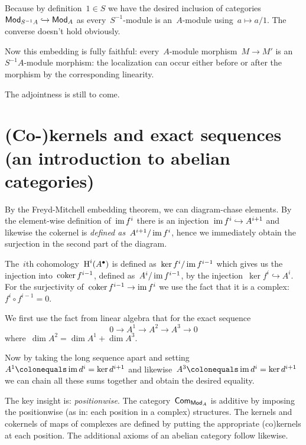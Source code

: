 \begin{exercise} %
  Because by definition~$1\in S$ we have the desired inclusion of categories~$\mathsf{Mod}_{S^{-1}A}\hookrightarrow\mathsf{Mod}_A$ as every~$S^{-1}$\nobreakdash-module is an~$A$\nobreakdash-module using~$a\mapsto a/1$. The converse doesn't hold obviously.

  Now this embedding is fully faithful: every~$A$\nobreakdash-module morphism~$M\to M'$ is an~$S^{-1}A$\nobreakdash-module morphism: the localization can occur either before or after the morphism by the corresponding linearity.

  The adjointness is still to come.
\end{exercise}


\section{(Co-)kernels and exact sequences (an introduction to abelian categories)}

\begin{exercise}
  By the Freyd-Mitchell embedding theorem, we can diagram-chase elements. By the element-wise definition of~$\operatorname{im} f^i$ there is an injection~$\operatorname{im} f^i\hookrightarrow A^{i+1}$ and likewise the cokernel is \emph{defined as}~$A^{i+1}/\operatorname{im} f^i$, hence we immediately obtain the surjection in the second part of the diagram.

  The~$i$th cohomology~$\operatorname{H}^i(A^\bullet)$ is defined as~$\ker f^i/\operatorname{im} f^{i-1}$ which gives us the injection into~$\operatorname{coker} f^{i-1}$, defined as~$A^i/\operatorname{im} f^{i-1}$, by the injection~$\ker f^{i}\hookrightarrow A^i$. For the surjectivity of~$\operatorname{coker} f^{i-1}\to\operatorname{im} f^i$ we use the fact that it is a complex:~$f^i\circ f^{i-1}=0$.
\end{exercise}

\begin{exercise}
  We first use the fact from linear algebra that for the exact sequence
  \begin{equation}
    0\to A^1\to A^2\to A^3\to 0
  \end{equation}
  where~$\dim A^2=\dim A^1+\dim A^3$.

  Now by taking the long sequence apart and setting~$A^1\colonequals\image d^i=\ker d^{i+1}$ and likewise~$A^3\colonequals\image d^i=\ker d^{i+1}$ we can chain all these sums together and obtain the desired equality.
\end{exercise}

\begin{exercise}
  The key insight is: \emph{positionwise}. The category~$\mathsf{Com}_{\mathsf{Mod}_A}$ is additive by imposing the positionwise (as in: each position in a complex) structures. The kernels and cokernels of maps of complexes are defined by putting the appropriate (co)kernels at each position. The additional axioms of an abelian category follow likewise.
\end{exercise}

